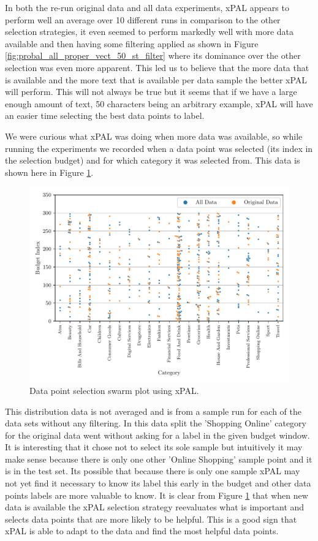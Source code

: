 In both the re-run original data and all data experiments, xPAL appears to perform well an average over 10 different runs in comparison to the other selection strategies, it even seemed to perform markedly well with more data available and then having some filtering applied as shown in Figure \ref{fig:probal_all_proper_vect_50_st_filter} where its dominance over the other selection was even more apparent. This led us to believe that the more data that is available and the more text that is available per data sample the better xPAL will perform. This will not always be true but it seems that if we have a large enough amount of text, 50 characters being an arbitrary example, xPAL will have an easier time selecting the best data points to label.


We were curious what xPAL was doing when more data was available, so while running the experiments we recorded when a data point was selected (its index in the selection budget) and for which category it was selected from. This data is shown here in Figure \ref{fig:xpal_data_selection}.

\begin{figure}[ht]
  \centering
  \includegraphics[width=\textwidth]{../img/plot_xpal_selection_dist.pdf}
  \caption{Data point selection swarm plot using xPAL.}
  \label{fig:xpal_data_selection}
\end{figure}

This distribution data is not averaged and is from a sample run for each of the data sets without any filtering. In this data split the 'Shopping Online' category for the original data went without asking for a label in the given budget window. It is interesting that it chose not to select its sole sample but intuitively it may make sense because there is only one other 'Online Shopping' sample point and it is in the test set. Its possible that because there is only one sample xPAL may not yet find it necessary to know its label this early in the budget and other data points labels are more valuable to know. It is clear from Figure \ref{fig:xpal_data_selection} that when new data is available the xPAL selection strategy reevaluates what is important and selects data points that are more likely to be helpful. This is a good sign that xPAL is able to adapt to the data and find the most helpful data points.

